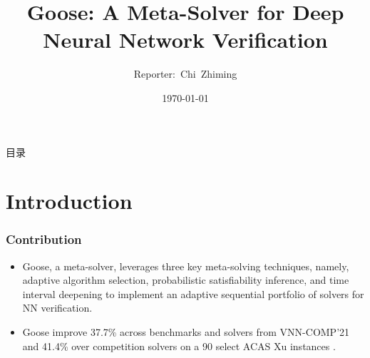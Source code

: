 \documentclass[aspectratio=169%
,serif,mathserif]{beamer}
\begin{document}
\title{Goose: A Meta-Solver for Deep Neural Network Verification} %
\author[Chi~Zhiming]{Reporter:~Chi~Zhiming} %
\institute[ISCAS] %
{	
}
	\CTEXoptions[today=old]
	\date{\today} %
\begin{frame}[plain]\vspace{1.5em}
\titlepage\vspace{-0.5cm}
\end{frame}
\begin{frame}{目录}
\tableofcontents
\end{frame}

\section{Introduction} %
\begin{frame}
	\frametitle{Contribution}
	\begin{itemize}
		\item Goose, a meta-solver, leverages three key meta-solving techniques, namely, adaptive algorithm selection, probabilistic satisfiability inference, and time interval deepening to implement an adaptive sequential portfolio of solvers for NN verification.
		\item Goose improve 37.7\% across benchmarks and solvers from VNN-COMP'21 and 41.4\% over competition solvers on a 90 select ACAS Xu instances .
	\end{itemize}

\end{frame}
\end{document}
